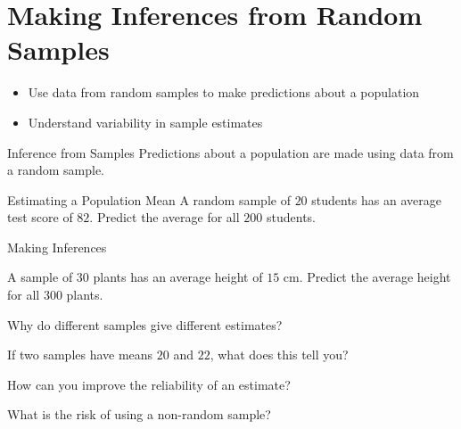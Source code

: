 \section{Making Inferences from Random Samples}

\begin{learningGoals}
\begin{itemize}
    \item Use data from random samples to make predictions about a population
    \item Understand variability in sample estimates
\end{itemize}
\end{learningGoals}

\begin{conceptBox}{Inference from Samples}
Predictions about a population are made using data from a random sample.
\end{conceptBox}

\begin{workedExample}{Estimating a Population Mean}
A random sample of $20$ students has an average test score of $82$. Predict the average for all $200$ students.
\end{workedExample}


\begin{practiceBox}{Making Inferences}
\resetProblems

\prob A sample of $30$ plants has an average height of $15$ cm. Predict the average height for all $300$ plants.

\prob Why do different samples give different estimates?

\prob If two samples have means $20$ and $22$, what does this tell you?

\prob How can you improve the reliability of an estimate?

\prob What is the risk of using a non-random sample?

\end{practiceBox}
